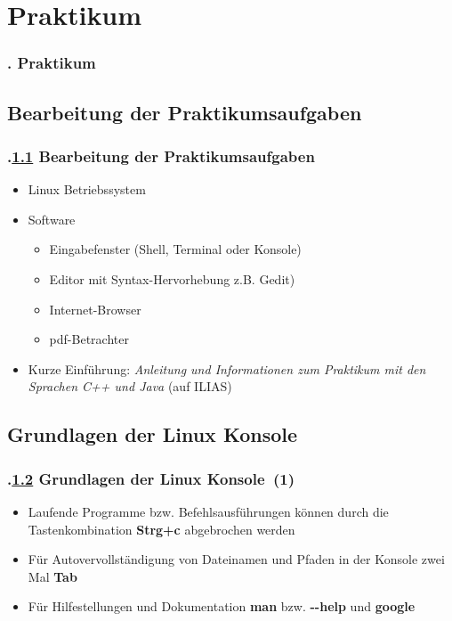 \AtBeginSection{}
\section{Praktikum}
\begin{frame}
  \frametitle{\kap. Praktikum}%
\tableofcontents[currentsection]
\end{frame}


\def\stitle{Bearbeitung der Praktikumsaufgaben}%
\subsection{\stitle}\label{S:PraktikumSCC}
\begin{frame}[t]%
  \frametitle{\kap.\ref{S:PraktikumSCC} \stitle}%

\begin{itemize}
  \item Linux Betriebssystem
  \item Software
  \begin{itemize}
    \item Eingabefenster (Shell, Terminal oder Konsole)
    \item Editor mit Syntax-Hervorhebung z.B. Gedit)
    \item Internet-Browser
    \item pdf-Betrachter
  \end{itemize}
  \item Kurze Einführung: \emph{Anleitung und Informationen zum Praktikum mit den Sprachen C++ und Java} (auf ILIAS)
\end{itemize}
\end{frame}


\def\stitle{Grundlagen der Linux Konsole}%
\subsection{\stitle}\label{S:Anleitung}
\begin{frame}[t]%
\frametitle{\kap.\ref{S:Anleitung} \stitle\ (1)}%

\begin{itemize}
  \item Laufende Programme bzw. Befehlsausführungen können durch die Tastenkombination \textbf{Strg+c} abgebrochen werden
  \item Für Autovervollständigung von Dateinamen und Pfaden in der Konsole zwei Mal \textbf{Tab}
  \item Für Hilfestellungen und Dokumentation \textbf{man} bzw. \textbf{-{}-help} und \textbf{google}
\end{itemize}
\end{frame}


